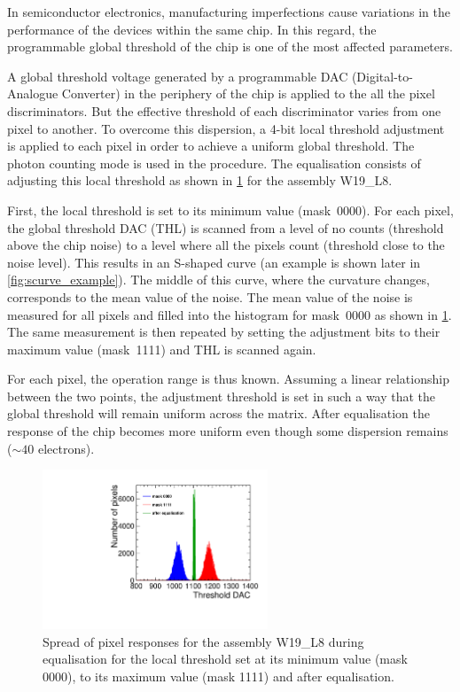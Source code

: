 In semiconductor electronics, manufacturing imperfections cause
variations in the performance of the devices within the same chip. In
this regard, the programmable global threshold of the chip is one of
the most affected parameters. 

A global threshold voltage generated by a programmable DAC
(Digital-to-Analogue Converter) in the periphery of the chip is
applied to the all the pixel discriminators. But the effective
threshold of each discriminator varies from one pixel to another. To
overcome this dispersion, a 4-bit local threshold adjustment is
applied to each pixel in order to achieve a uniform global
threshold. The photon counting mode is used in the procedure. The
equalisation consists of adjusting this local threshold as shown in
\cref{fig:THLequalisation} for the assembly W19\_L8.

First, the local threshold is set to its minimum value
(mask~0000). For each pixel, the global threshold DAC (THL) is scanned
from a level of no counts (threshold above the chip noise) to a level
where all the pixels count (threshold close to the noise level). This
results in an S-shaped curve (an example is shown later in
\cref{fig:scurve_example}). The middle of this curve, where the
curvature changes, corresponds to the mean value of the noise. The
mean value of the noise is measured for all pixels and filled into the
histogram for mask~0000 as shown in \cref{fig:THLequalisation}. The
same measurement is then repeated by setting the adjustment bits to
their maximum value (mask~1111) and THL is scanned again. 

For each pixel, the operation range is thus known. Assuming a linear
relationship between the two points, the adjustment threshold is set
in such a way that the global threshold will remain uniform across the
matrix. After equalisation the response of the chip becomes more
uniform even though some dispersion remains ($\sim40$ electrons).


\begin{figure}[htbp] 
  \centering
  \includegraphics[width=0.6\textwidth]{./figures/Calibration/THLequalisation_W19_L8.pdf}
  \caption{Spread of pixel responses for the assembly W19\_L8 during
    equalisation for the local threshold set at its minimum value
    (mask 0000), to its maximum value (mask 1111) and after
    equalisation.}
  \label{fig:THLequalisation}
\end{figure}


